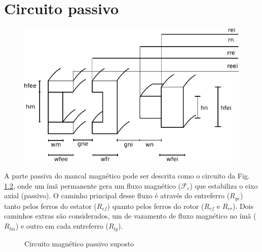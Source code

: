 \pagestyle{empty}
\cleardoublepage
\pagestyle{fancy}


\chapter{Circuito passivo}


\begin{figure}
	\centering
	\includegraphics[width=0.8\linewidth]{Figs/modelo_dimensoes}
	\caption{}
	\label{fig:modelo_dimensoes}
\end{figure}


A parte passiva do mancal magnético pode ser descrita como o circuito da Fig. \ref{Fig:Modelagem:circuito:passivo:umlado}, onde um ímã permanente gera um fluxo magnético ($\mathcal{F}_c$) que estabiliza o eixo axial (passivo). O caminho principal desse fluxo é através do entreferro ($R_{ge}$) tanto pelos ferros do estator ($R_{ef}$) quanto pelos ferros do rotor ($R_{rf}$ e $R_{rr}$). Dois caminhos extras são considerados, um de vazamento de fluxo magnético no ímã ($R_{lm}$) e outro em cada entreferro ($R_{lg}$). 

\begin{figure}[!ht]
	\centering
	\def\svgwidth{1\columnwidth}
	
	\caption{Circuito magnético passivo suposto}
	\label{Fig:Modelagem:circuito:passivo:umlado}
\end{figure}


